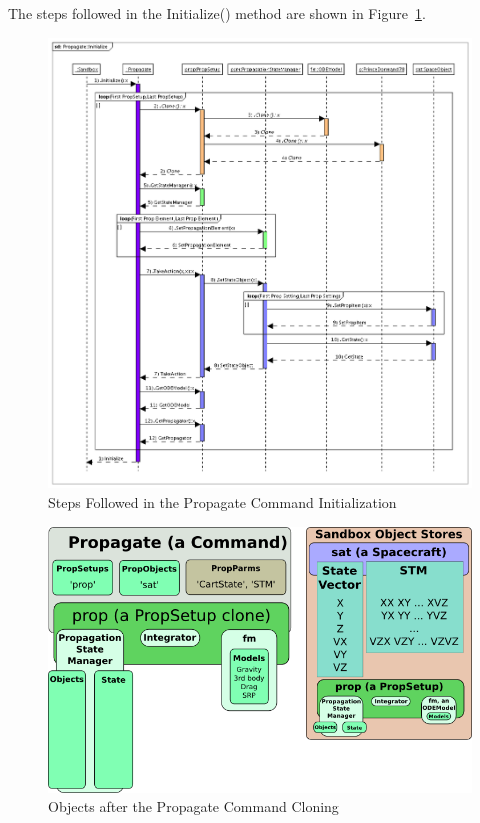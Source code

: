 \documentclass[11pt]{article}
\begin{document}
The steps followed in the Initialize() method are shown in Figure~\ref{fig:PropagateInitialize}.

\begin{figure}[p] 
   \centering
   \includegraphics[width=6.5in]{Images/PropagateInitialize.png} 
   \caption{Steps Followed in the Propagate Command Initialization}
   \label{fig:PropagateInitialize}
\end{figure}

\begin{figure}[htb] 
   \centering
   \includegraphics[width=5.5in]{Images/PersistenceCloned.png} 
   \caption{Objects after the Propagate Command Cloning}
   \label{fig:PersistenceCloned}
\end{figure}
\end{document}
